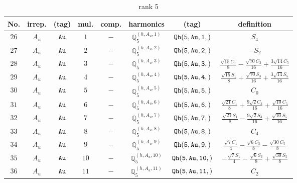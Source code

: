 \documentclass[fleqn,8pt]{jsarticle}
\begin{document}
\begin{table}[ht!]
\begin{center}
\caption{rank 5}
\renewcommand{\arraystretch}{1.3}
\begin{tabular}{cccccccc} \hline \hline
No. & irrep. & (tag) & mul. & comp. & harmonics & (tag) & definition \\ \hline
$ 26 $ & $ A_{u} $ & $ {\tt Au} $ & $ 1 $ & $ - $ & $ \mathbb{Q}_{5}^{(h,A_{u},1)} $ & $ {\tt Qh(5,Au,1,)} $ & $ S_{4} $ \\
$ 27 $ & $ A_{u} $ & $ {\tt Au} $ & $ 2 $ & $ - $ & $ \mathbb{Q}_{5}^{(h,A_{u},2)} $ & $ {\tt Qh(5,Au,2,)} $ & $ - S_{2} $ \\
$ 28 $ & $ A_{u} $ & $ {\tt Au} $ & $ 3 $ & $ - $ & $ \mathbb{Q}_{5}^{(h,A_{u},3)} $ & $ {\tt Qh(5,Au,3,)} $ & $ \frac{\sqrt{15} C_{1}}{8} - \frac{\sqrt{70} C_{3}}{16} + \frac{3 \sqrt{14} C_{5}}{16} $ \\
$ 29 $ & $ A_{u} $ & $ {\tt Au} $ & $ 4 $ & $ - $ & $ \mathbb{Q}_{5}^{(h,A_{u},4)} $ & $ {\tt Qh(5,Au,4,)} $ & $ \frac{\sqrt{15} S_{1}}{8} + \frac{\sqrt{70} S_{3}}{16} + \frac{3 \sqrt{14} S_{5}}{16} $ \\
$ 30 $ & $ A_{u} $ & $ {\tt Au} $ & $ 5 $ & $ - $ & $ \mathbb{Q}_{5}^{(h,A_{u},5)} $ & $ {\tt Qh(5,Au,5,)} $ & $ C_{0} $ \\
$ 31 $ & $ A_{u} $ & $ {\tt Au} $ & $ 6 $ & $ - $ & $ \mathbb{Q}_{5}^{(h,A_{u},6)} $ & $ {\tt Qh(5,Au,6,)} $ & $ \frac{\sqrt{21} C_{1}}{8} + \frac{9 \sqrt{2} C_{3}}{16} + \frac{\sqrt{10} C_{5}}{16} $ \\
$ 32 $ & $ A_{u} $ & $ {\tt Au} $ & $ 7 $ & $ - $ & $ \mathbb{Q}_{5}^{(h,A_{u},7)} $ & $ {\tt Qh(5,Au,7,)} $ & $ \frac{\sqrt{21} S_{1}}{8} - \frac{9 \sqrt{2} S_{3}}{16} + \frac{\sqrt{10} S_{5}}{16} $ \\
$ 33 $ & $ A_{u} $ & $ {\tt Au} $ & $ 8 $ & $ - $ & $ \mathbb{Q}_{5}^{(h,A_{u},8)} $ & $ {\tt Qh(5,Au,8,)} $ & $ C_{4} $ \\
$ 34 $ & $ A_{u} $ & $ {\tt Au} $ & $ 9 $ & $ - $ & $ \mathbb{Q}_{5}^{(h,A_{u},9)} $ & $ {\tt Qh(5,Au,9,)} $ & $ \frac{\sqrt{7} C_{1}}{4} - \frac{\sqrt{6} C_{3}}{8} - \frac{\sqrt{30} C_{5}}{8} $ \\
$ 35 $ & $ A_{u} $ & $ {\tt Au} $ & $ 10 $ & $ - $ & $ \mathbb{Q}_{5}^{(h,A_{u},10)} $ & $ {\tt Qh(5,Au,10,)} $ & $ - \frac{\sqrt{7} S_{1}}{4} - \frac{\sqrt{6} S_{3}}{8} + \frac{\sqrt{30} S_{5}}{8} $ \\
$ 36 $ & $ A_{u} $ & $ {\tt Au} $ & $ 11 $ & $ - $ & $ \mathbb{Q}_{5}^{(h,A_{u},11)} $ & $ {\tt Qh(5,Au,11,)} $ & $ C_{2} $ \\
 \hline \hline
\end{tabular}
\end{center}
\end{table}
\end{document}
